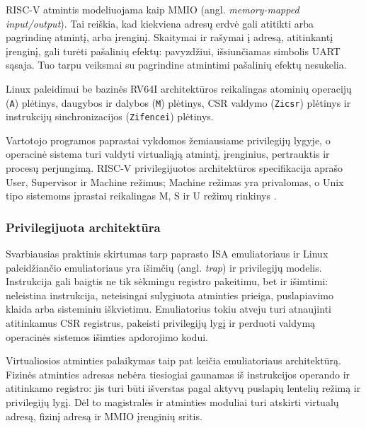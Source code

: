 RISC-V atmintis modeliuojama kaip MMIO (angl. \textit{memory-mapped input/output}). Tai reiškia, kad kiekviena adresų erdvė gali atitikti arba pagrindinę atmintį, arba įrenginį. Skaitymai ir rašymai į adresą, atitinkantį įrenginį, gali turėti pašalinių efektų: pavyzdžiui, išsiunčiamas simbolis UART sąsaja. Tuo tarpu veiksmai su pagrindine atmintimi pašalinių efektų nesukelia.

Linux paleidimui be bazinės RV64I architektūros reikalingas atominių operacijų (\texttt{A}) plėtinys, daugybos ir dalybos (\texttt{M}) plėtinys, CSR valdymo (\texttt{Zicsr}) plėtinys ir instrukcijų sinchronizacijos (\texttt{Zifencei}) plėtinys.

Vartotojo programos paprastai vykdomos žemiausiame privilegijų lygyje, o operacinė sistema turi valdyti virtualiąją atmintį, įrenginius, pertrauktis ir procesų perjungimą. RISC-V privilegijuotos architektūros specifikacija aprašo User, Supervisor ir Machine režimus; Machine režimas yra privalomas, o Unix tipo sistemoms įprastai reikalingas M, S ir U režimų rinkinys \cite[p.~11--12]{riscv-privileged-20260120}.
\subsubsection{Privilegijuota architektūra}

Svarbiausias praktinis skirtumas tarp paprasto ISA emuliatoriaus ir Linux paleidžiančio emuliatoriaus yra išimčių (angl. \textit{trap}) ir privilegijų modelis. Instrukcija gali baigtis ne tik sėkmingu registro pakeitimu, bet ir išimtimi: neleistina instrukcija, neteisingai sulygiuota atminties prieiga, puslapiavimo klaida arba sisteminiu iškvietimu. Emuliatorius tokiu atveju turi atnaujinti atitinkamus CSR registrus, pakeisti privilegijų lygį ir perduoti valdymą operacinės sistemos išimties apdorojimo kodui.

Virtualiosios atminties palaikymas taip pat keičia emuliatoriaus architektūrą. Fizinės atminties adresas nebėra tiesiogiai gaunamas iš instrukcijos operando ir atitinkamo registro: jis turi būti išverstas pagal aktyvų puslapių lentelių režimą ir privilegijų lygį. Dėl to magistralės ir atminties moduliai turi atskirti virtualų adresą, fizinį adresą ir MMIO įrenginių sritis.
